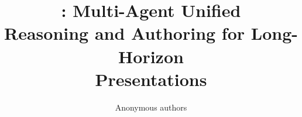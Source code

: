 \documentclass{article}
\title{\fullsys: Multi-Agent Unified\\
Reasoning and Authoring for Long-Horizon\\
Presentations}
\author{Anonymous authors}
\begin{document}
\maketitle





\label{main:end}




\appendix

\end{document}
